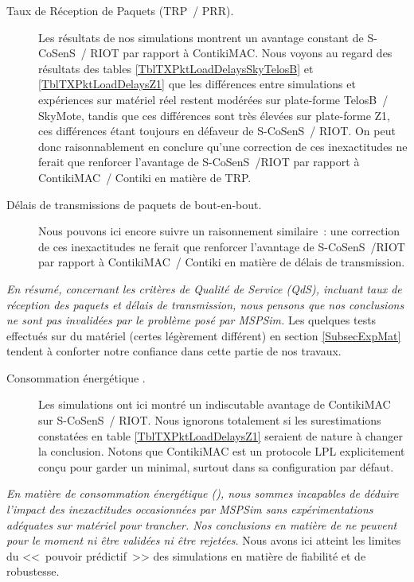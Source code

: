 \begin{description}

\item[Taux de Réception de Paquets (TRP~/ PRR).] 
Les résultats de nos simulations montrent un avantage constant de S-CoSenS~/
RIOT par rapport à ContikiMAC. Nous voyons au regard des résultats
des tables \vref{TblTXPktLoadDelaysSkyTelosB} et \vref{TblTXPktLoadDelaysZ1}
que les différences entre simulations et expériences sur matériel réel
restent modérées sur plate-forme TelosB~/ SkyMote, tandis que ces
différences sont très élevées sur plate-forme Z1, ces différences
étant toujours en défaveur de S-CoSenS~/ RIOT.
On peut donc raisonnablement en conclure qu'une correction de ces
inexactitudes ne ferait que renforcer l'avantage de S-CoSenS~/RIOT
par rapport à ContikiMAC~/ Contiki en matière de TRP.

\item[Délais de transmissions de paquets de bout-en-bout.] Nous pouvons
ici encore suivre un raisonnement similaire~: une correction de ces
inexactitudes ne ferait que renforcer l'avantage de S-CoSenS~/RIOT
par rapport à ContikiMAC~/ Contiki en matière de délais de transmission.

\end{description}

\noindent\emph{En résumé, concernant les critères de Qualité de Service
(QdS), incluant taux de réception des paquets et délais de transmission,
nous pensons que nos conclusions ne sont pas invalidées par le problème
posé par MSPSim.} Les quelques tests effectués sur du matériel (certes
légèrement différent) en section \vref{SubsecExpMat} tendent à 
conforter notre confiance dans cette partie de nos travaux.

\begin{description}

\item[Consommation énergétique .] Les simulations
ont ici montré un indiscutable avantage de ContikiMAC sur S-CoSenS~/ RIOT.
Nous ignorons totalement si les surestimations constatées en table
\vref{TblTXPktLoadDelaysZ1} seraient de nature à changer la conclusion.
Notons que ContikiMAC est un protocole LPL explicitement conçu pour
garder un  minimal, surtout dans sa configuration
par défaut.

\end{description}

\noindent\emph{En matière de consommation énergétique (), nous sommes incapables de déduire l'impact des inexactitudes
occasionnées par MSPSim sans expérimentations adéquates sur matériel pour
trancher. Nos conclusions en matière de  ne peuvent pour
le moment ni être validées ni être rejetées.} Nous avons ici atteint les
limites du <<~pouvoir prédictif~>> des simulations en matière
de fiabilité et de robustesse.

